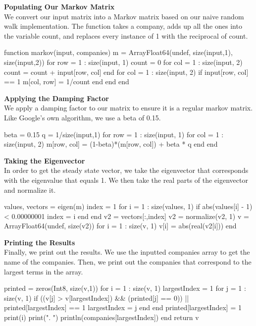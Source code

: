 \documentclass{article}
\begin{document}
\textbf{Populating Our Markov Matrix}\\
We convert our input matrix into a Markov matrix based on our naive random walk implementation. The function takes a company, adds up all the ones into the variable count, and replaces every instance of 1 with the reciprocal of count.\\
\begin{codeblock}
function markov(input, companies)
    m = Array{Float64}(undef, size(input,1), size(input,2))
    for row = 1 : size(input, 1)
        count = 0
        for col = 1 : size(input, 2)
            count = count + input[row, col]
        end
        for col = 1 : size(input, 2)
            if input[row, col] == 1
                m[col, row] = 1/count
            end
        end
    end
\end{codeblock}
\textbf{Applying the Damping Factor}\\
We apply a damping factor to our matrix to ensure it is a regular markov matrix. Like Google's own algorithm, we use a beta of 0.15.
\begin{codeblock}
beta = 0.15
q = 1/size(input,1)
for row = 1 : size(input, 1)
    for col = 1 : size(input, 2)
        m[row, col] = (1-beta)*(m[row, col]) + beta * q
    end
end
\end{codeblock}
\textbf{Taking the Eigenvector}\\
In order to get the steady state vector, we take the eigenvector that corresponds with the eigenvalue that equals 1. We then take the real parts of the eigenvector and normalize it.
\begin{codeblock}
values, vectors = eigen(m)
index = 1
for i = 1 : size(values, 1)
    if abs(values[i] - 1) < 0.00000001
        index = i
    end
end
v2 = vectors[:,index]
v2 = normalize(v2, 1)
v = Array{Float64}(undef, size(v2))
for i = 1 : size(v, 1)
    v[i] = abs(real(v2[i]))
end
\end{codeblock}
\textbf{Printing the Results}\\
Finally, we print out the results. We use the inputted companies array to get the name of the companies. Then, we print out the companies that correspond to the largest terms in the array.
\begin{codeblock}
printed = zeros(Int8, size(v,1))
for i = 1 : size(v, 1)
    largestIndex = 1
    for j = 1 : size(v, 1)
        if ((v[j] > v[largestIndex]) && (printed[j] == 0)) || printed[largestIndex] == 1
            largestIndex = j
        end
    end
    printed[largestIndex] = 1
    print(i)
    print(". ")
    println(companies[largestIndex])
end
return v
\end{codeblock}
\end{document}
